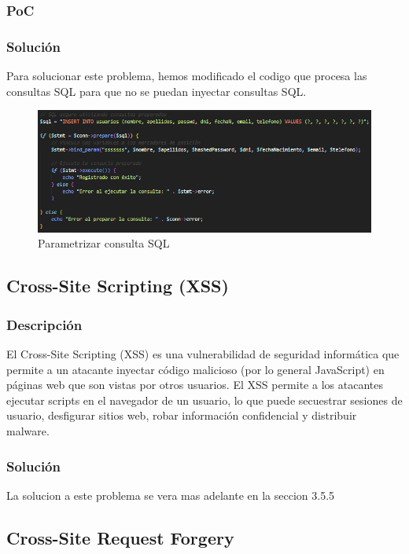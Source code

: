 \documentclass{report}
\begin{document}
                \subsubsection{PoC}
                \subsubsection{Solución}
                    Para solucionar este problema, hemos modificado el codigo que procesa las consultas SQL para que no se puedan inyectar consultas SQL.
                    \begin{figure}[H]
                        \centering
                        \includegraphics[width=\textwidth]{./img/vulnerabilidades/3.3/1.1.png}
                        \caption{Parametrizar consulta SQL}
                    \end{figure}
            \clearpage
            \subsection{Cross-Site Scripting (XSS)}
                \subsubsection{Descripción}
                    El Cross-Site Scripting (XSS) es una vulnerabilidad de seguridad informática que permite a un atacante inyectar código malicioso (por lo general JavaScript) en páginas web que son vistas por otros usuarios. El XSS permite a los atacantes ejecutar scripts en el navegador de un usuario, lo que puede secuestrar sesiones de usuario, desfigurar sitios web, robar información confidencial y distribuir malware.
                \subsubsection{Solución}
                    La solucion a este problema se vera mas adelante en la seccion 3.5.5
            \clearpage
            \subsection{Cross-Site Request Forgery}
\end{document}
